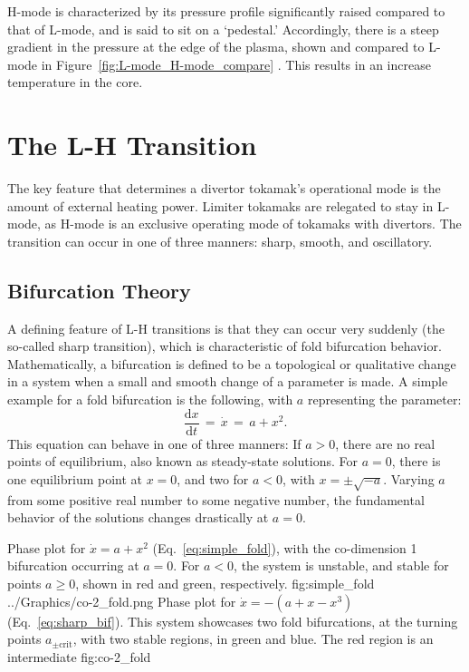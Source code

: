H-mode is characterized by its pressure profile significantly raised compared to that of L-mode, and is said to sit on a `pedestal.'
Accordingly, there is a steep gradient in the pressure at the edge of the plasma, shown and compared to L-mode in Figure~\ref{fig:L-mode_H-mode_compare} \cite{weymiens_bifurcation_2014}.
This results in an increase temperature in the core.

\section{The L-H Transition}
The key feature that determines a divertor tokamak's operational mode is the amount of external heating power.
Limiter tokamaks are relegated to stay in L-mode, as H-mode is an exclusive operating mode of tokamaks with divertors.
The transition can occur in one of three manners: sharp, smooth, and oscillatory.

\subsection{Bifurcation Theory}
A defining feature of L-H transitions is that they can occur very suddenly (the so-called sharp transition), which is characteristic of fold bifurcation behavior.
Mathematically, a bifurcation is defined to be a topological or qualitative change in a system when a small and smooth change of a parameter is made.
A simple example for a fold bifurcation is the following, with $a$ representing the parameter:
\begin{equation}
	\frac{\text{d}x}{\text{d}t} \,=\, \dot{x} \,=\, a + x^2.
	\label{eq:simple_fold}
\end{equation}
This equation can behave in one of three manners:
If $a > 0$, there are no real points of equilibrium, also known as steady-state solutions.
For $a = 0$, there is one equilibrium point at $x = 0$, and two for $a < 0$, with $x = \pm\sqrt{-a}$.
Varying $a$ from some positive real number to some negative number, the fundamental behavior of the solutions changes drastically at $a = 0$.

	{Phase plot for $\dot{x} = a + x^2$ (Eq.~\ref{eq:simple_fold}), with the co-dimension 1 bifurcation occurring at $a = 0$. For $a < 0$, the system is unstable, and stable for points $a \geq 0$, shown in red and green, respectively.}
	{fig:simple_fold}
	{../Graphics/co-2_fold.png}
	{Phase plot for $\dot{x} = -(a + x - x^3)$ (Eq.~\ref{eq:sharp_bif}). This system showcases two fold bifurcations, at the turning points $a_{\pm\text{crit}}$, with two stable regions, in green and blue. The red region is an intermediate}
	{fig:co-2_fold}

